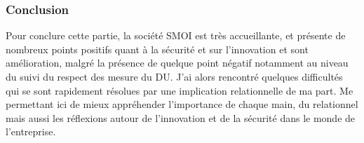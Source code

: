 \subsubsection{Conclusion}

Pour conclure cette partie, la société SMOI est très accueillante, et présente de nombreux points positifs quant à la sécurité et sur l'innovation et sont amélioration, malgré la présence de quelque point négatif notamment au niveau du suivi du respect des mesure du DU. J'ai alors rencontré quelques difficultés qui se sont rapidement résolues par une implication relationnelle de ma part. Me permettant ici de mieux appréhender l'importance de chaque main, du relationnel mais aussi les réflexions autour de l'innovation et de la sécurité dans le monde de l'entreprise.